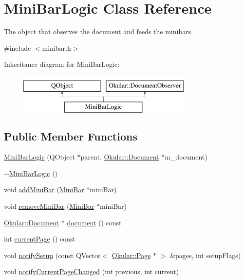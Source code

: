 \hypertarget{classMiniBarLogic}{\section{Mini\+Bar\+Logic Class Reference}
\label{classMiniBarLogic}
}


The object that observes the document and feeds the minibars.  




{\ttfamily \#include $<$minibar.\+h$>$}

Inheritance diagram for Mini\+Bar\+Logic\+:\begin{figure}[H]
\begin{center}
\leavevmode
\includegraphics[height=2.000000cm]{classMiniBarLogic}
\end{center}
\end{figure}
\subsection*{Public Member Functions}
\begin{DoxyCompactItemize}
\item 
\hyperlink{classMiniBarLogic_a7bf174325973dd89b5cc28fca9ea9d56}{Mini\+Bar\+Logic} (Q\+Object $\ast$parent, \hyperlink{classOkular_1_1Document}{Okular\+::\+Document} $\ast$m\+\_\+document)
\item 
\hyperlink{classMiniBarLogic_a5ec33db020492835c0b7015c01cabc8d}{$\sim$\+Mini\+Bar\+Logic} ()
\item 
void \hyperlink{classMiniBarLogic_a87a87879be36670674541361566b0ed7}{add\+Mini\+Bar} (\hyperlink{classMiniBar}{Mini\+Bar} $\ast$mini\+Bar)
\item 
void \hyperlink{classMiniBarLogic_a770182cc59d80b7e8cabfc8d153c7a79}{remove\+Mini\+Bar} (\hyperlink{classMiniBar}{Mini\+Bar} $\ast$mini\+Bar)
\item 
\hyperlink{classOkular_1_1Document}{Okular\+::\+Document} $\ast$ \hyperlink{classMiniBarLogic_a6ff154c4a6afc3b7b72d33c408879282}{document} () const 
\item 
int \hyperlink{classMiniBarLogic_a24524db1abd64a39da93c33a49d914b5}{current\+Page} () const 
\item 
void \hyperlink{classMiniBarLogic_ad1fa9b146237729baed32cc4bda6098c}{notify\+Setup} (const Q\+Vector$<$ \hyperlink{classOkular_1_1Page}{Okular\+::\+Page} $\ast$ $>$ \&pages, int setup\+Flags)
\item 
void \hyperlink{classMiniBarLogic_afa52e19b681f520b45efc4293af4accd}{notify\+Current\+Page\+Changed} (int previous, int current)
\end{DoxyCompactItemize}
